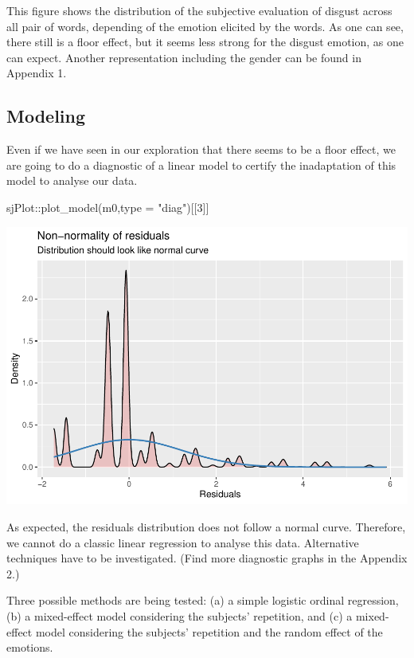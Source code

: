 \documentclass[
]{article}
\newenvironment{Shaded}{\begin{snugshade}}{\end{snugshade}}
\newcommand{\AttributeTok}[1]{\textcolor[rgb]{0.77,0.63,0.00}{#1}}
\newcommand{\DecValTok}[1]{\textcolor[rgb]{0.00,0.00,0.81}{#1}}
\newcommand{\FunctionTok}[1]{\textcolor[rgb]{0.00,0.00,0.00}{#1}}
\newcommand{\NormalTok}[1]{#1}
\newcommand{\SpecialCharTok}[1]{\textcolor[rgb]{0.00,0.00,0.00}{#1}}
\newcommand{\StringTok}[1]{\textcolor[rgb]{0.31,0.60,0.02}{#1}}
\begin{document}
This figure shows the distribution of the subjective evaluation of
disgust across all pair of words, depending of the emotion elicited by
the words. As one can see, there still is a floor effect, but it seems
less strong for the disgust emotion, as one can expect. Another
representation including the gender can be found in Appendix 1.

\hypertarget{modeling}{%
\subsection{Modeling}\label{modeling}}

Even if we have seen in our exploration that there seems to be a floor
effect, we are going to do a diagnostic of a linear model to certify the
inadaptation of this model to analyse our data.

\begin{Shaded}
\begin{Highlighting}[]
\NormalTok{sjPlot}\SpecialCharTok{::}\FunctionTok{plot\_model}\NormalTok{(m0,}\AttributeTok{type =} \StringTok{"diag"}\NormalTok{)[[}\DecValTok{3}\NormalTok{]]}
\end{Highlighting}
\end{Shaded}

\includegraphics{DAP_v4-1-22_files/figure-latex/normal analysis of resids-1.pdf}

As expected, the residuals distribution does not follow a normal curve.
Therefore, we cannot do a classic linear regression to analyse this
data. Alternative techniques have to be investigated. (Find more
diagnostic graphs in the Appendix 2.)

Three possible methods are being tested: (a) a simple logistic ordinal
regression, (b) a mixed-effect model considering the subjects'
repetition, and (c) a mixed-effect model considering the subjects'
repetition and the random effect of the emotions.
\end{document}
